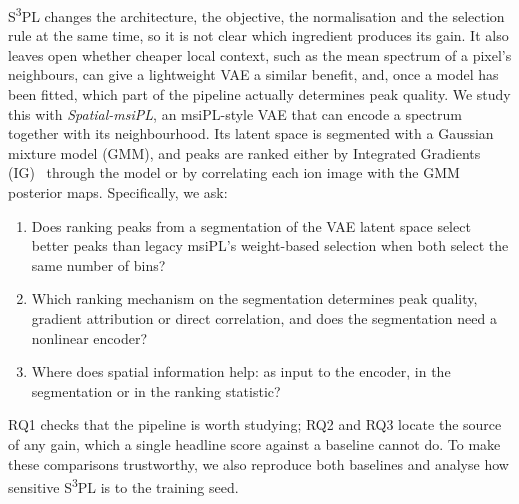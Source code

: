 S\textsuperscript{3}PL changes the architecture, the objective, the normalisation and the
selection rule at the same time, so it is not clear which ingredient produces
its gain. It also leaves open whether cheaper local context, such as the
mean spectrum of a pixel's neighbours, can give a lightweight VAE a similar
benefit, and, once a model has been fitted, which part of the pipeline actually
determines peak quality. We study this with
\emph{Spatial-msiPL}, an msiPL-style VAE that can encode a spectrum together
with its neighbourhood. Its latent space is segmented with a Gaussian mixture
model (GMM), and peaks are ranked either by Integrated Gradients
(IG)~\citep{sundararajan2017axiomatic} through the model or by correlating each
ion image with the GMM posterior maps. Specifically, we ask:
\begin{enumerate}[label=\textbf{RQ\arabic*}]
  \item Does ranking peaks from a segmentation of the VAE latent space select
        better peaks than legacy msiPL's weight-based selection when both select
        the same number of bins?
  \item Which ranking mechanism on the segmentation determines peak quality,
        gradient attribution or direct correlation, and does the segmentation
        need a nonlinear encoder?
  \item Where does spatial information help: as input to the encoder, in the
        segmentation or in the ranking statistic?
\end{enumerate}
RQ1 checks that the pipeline is worth studying; RQ2 and RQ3 locate the source
of any gain, which a single headline score against a baseline cannot do. To
make these comparisons trustworthy, we also reproduce both baselines and
analyse how sensitive S\textsuperscript{3}PL is to the training seed.

